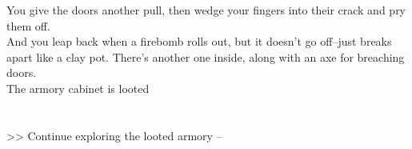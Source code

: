 You give the doors another pull, then wedge your fingers into their crack and pry them off.\\

And you leap back when a firebomb rolls out, but it doesn’t go off--just breaks apart like a clay pot. There’s another one inside, along with an axe for breaching doors.\\
 The armory cabinet is looted\\
\\
\\

>> Continue exploring the looted armory -- 